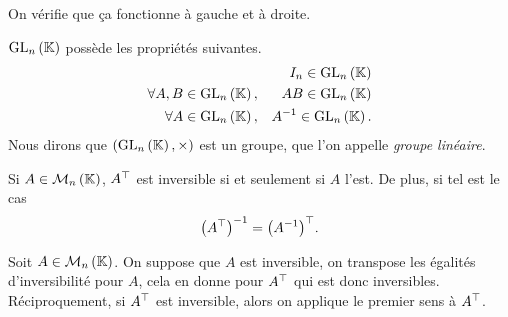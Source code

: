 \documentclass{magnolia}
\begin{document}
  \begin{preuve}
  On vérifie que ça fonctionne à gauche et à droite.
  \end{preuve}
 
\begin{proposition}
${\rm GL}_{n}\left(\mathbb{K}\right)$ possède les propriétés suivantes.
\begin{eqnarray*}
& & I_n\in{\rm GL}_{n}\left(\mathbb{K}\right)\\
\forall A,B\in{\rm GL}_{n}\left(\mathbb{K}\right),& & AB\in{\rm GL}_{n}\left(\mathbb{K}\right)\\
\forall A\in{\rm GL}_{n}\left(\mathbb{K}\right),& & A^{-1}\in{\rm GL}_{n}\left(\mathbb{K}\right).
\end{eqnarray*}
Nous dirons que $({\rm GL}_{n}\left(\mathbb{K}\right),\times)$ est un groupe, que l'on appelle \emph{groupe linéaire}.
\end{proposition}


  
  \begin{proposition}[utile=-3]
  Si $A\in\mathcal{M}_{n}\left(\mathbb{K}\right)$, ${A}^{\top}$ est inversible si et seulement si $A$ l'est.
  De plus, si tel est le cas
  \[\left({A}^{\top}\right)^{-1}={\left(A^{-1}\right)}^{\top}.\]
  \end{proposition}
  
  \begin{preuve}
  Soit $A\in\mathcal{M}_{n}\left(\mathbb{K}\right)$. On suppose que $A$ est inversible, on transpose les égalités d'inversibilité pour $A$, cela en donne pour ${A}^{\top}$ qui est donc inversibles. Réciproquement, si ${A}^{\top}$ est inversible, alors on applique le premier sens à ${A}^{\top}$.
  \end{preuve}
  








\end{document}

